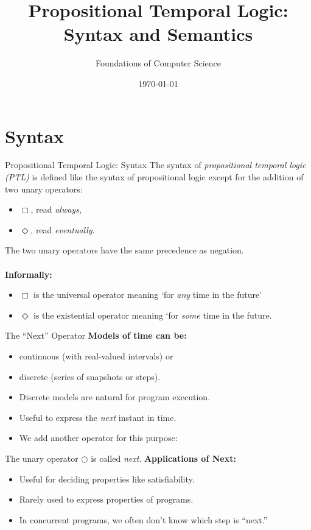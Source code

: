 \documentclass[style=sailor,size=12pt,mode=present]{powerdot}
\title{Propositional Temporal Logic: Syntax and Semantics}
\author{Foundations of Computer Science}
\date{\today}
\theoremstyle{definition}
\newenvironment{defn}[1]
  {\renewcommand\theinnerdefn{#1}\innerdefn}
  {\endinnerdefn}
\begin{document}
\maketitle
\section[slide=false]{Syntax}
\begin{slide}[bm=,toc=]{Propositional Temporal Logic: Syntax}
\begin{defn}{13.2}[Ben Ari]
The syntax of \emph{propositional temporal logic (PTL)} is defined like
the syntax of propositional logic except for the addition of two unary
operators:
\end{defn}
\vspace{-2ex}
\begin{itemize}
\item $\Box$, read \emph{always},
\item $\Diamond$, read \emph{eventually}.
\end{itemize}
The two unary operators have the same precedence as negation.\\~\\
{\bf Informally:}
\begin{itemize}
\item $\Box$ is the universal operator meaning `for \emph{any} time in the
future'
\item $\Diamond$ is the existential operator meaning `for \emph{some} time in
the future.
\end{itemize}
\end{slide}

\begin{wideslide}[bm=,toc=]{The ``Next'' Operator}
{\bf Models of time can be:}
\begin{itemize}
\item continuous (with real-valued intervals) or
\item discrete (series of snapshots or steps).
\item Discrete models are natural for program execution.
\item Useful to express the \emph{next} instant in time.
\item We add another operator for this purpose:
\end{itemize}
\begin{defn}{13.23}[Ben Ari]
The unary operator $\Circle$ is called \emph{next}.
\end{defn}
{\bf Applications of Next:}
\begin{itemize}
\item Useful for deciding properties like satisfiability.
\item Rarely used to express properties of programs.
\item In concurrent programs, we often don't know which step is ``next.''
\end{itemize}
\end{wideslide}
\end{document}
